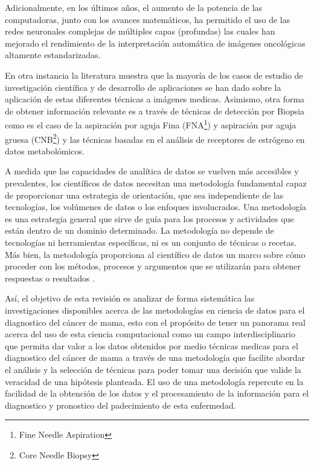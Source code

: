 Adicionalmente, en los últimos años, el aumento de la potencia de las computadoras, junto con los avances matemáticos, ha permitido el uso de las redes neuronales complejas de múltiples capas (profundas) las cuales han mejorado el rendimiento de la interpretación automática de imágenes oncológicas altamente estandarizadas\citep{Mann2020}.

En otra instancia la literatura muestra que la mayoría de los casos de estudio de investigación científica y de desarrollo de aplicaciones se han dado sobre la aplicación de estas diferentes técnicas a imágenes medicas. Asimismo, otra forma de obtener información relevante es a través de técnicas de detección por Biopsia como es el caso de la aspiración por aguja Fina (FNA\footnote{Fine Needle Aspiration}) y aspiración por aguja gruesa (CNB\footnote{Core Needle Biopsy}) y las técnicas basadas en el análisis de receptores de estrógeno en datos metabolómicos. 

A medida que las capacidades de analítica de datos se vuelven más accesibles y prevalentes, los científicos de datos necesitan una metodología fundamental capaz de proporcionar una estrategia de orientación, que sea independiente de las tecnologías, los volúmenes de datos o los enfoques involucrados. Una metodología es una estrategia general que sirve de guía para los procesos y actividades que están dentro de un dominio determinado. La metodología no depende de tecnologías ni herramientas específicas, ni es un conjunto de técnicas o recetas. Más bien, la metodología proporciona al científico de datos un marco sobre cómo proceder con los métodos, procesos y argumentos que se utilizarán para obtener respuestas o resultados\citep{Rollins2015} .

Así, el objetivo de esta revisión es analizar de forma sistemática las investigaciones disponibles acerca de las metodologías en ciencia de datos para el diagnostico del cáncer de mama, esto con el propósito de tener un panorama real acerca del uso de esta ciencia computacional como un campo interdisciplinario que permita dar valor a los datos obtenidos por medio técnicas medicas para el diagnostico del cáncer de mama a través de una metodología que facilite abordar el análisis y la selección de técnicas para poder tomar una decisión que valide la veracidad de una hipótesis planteada. El uso de una metodología repercute en la facilidad de la obtención de los datos y el procesamiento de la información para el diagnostico y pronostico del padecimiento de esta enfermedad.